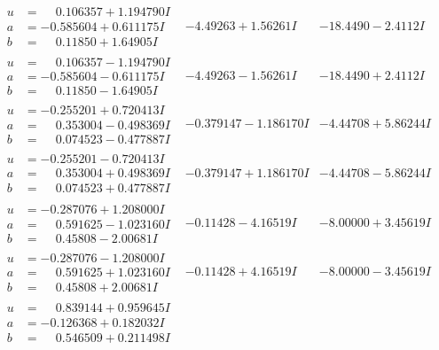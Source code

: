 \documentclass[1p]{elsarticle_modified}
\theoremstyle{definition}
\begin{document}
$$\begin{array}{c|c|c}
\begin{aligned}
u &= \phantom{-}0.106357 + 1.194790 I \\
a &= -0.585604 + 0.611175 I \\
b &= \phantom{-}0.11850 + 1.64905 I\end{aligned}
 & -4.49263 + 1.56261 I & -18.4490 - 2.4112 I \\ \hline\begin{aligned}
u &= \phantom{-}0.106357 - 1.194790 I \\
a &= -0.585604 - 0.611175 I \\
b &= \phantom{-}0.11850 - 1.64905 I\end{aligned}
 & -4.49263 - 1.56261 I & -18.4490 + 2.4112 I \\ \hline\begin{aligned}
u &= -0.255201 + 0.720413 I \\
a &= \phantom{-}0.353004 - 0.498369 I \\
b &= \phantom{-}0.074523 - 0.477887 I\end{aligned}
 & -0.379147 - 1.186170 I & -4.44708 + 5.86244 I \\ \hline\begin{aligned}
u &= -0.255201 - 0.720413 I \\
a &= \phantom{-}0.353004 + 0.498369 I \\
b &= \phantom{-}0.074523 + 0.477887 I\end{aligned}
 & -0.379147 + 1.186170 I & -4.44708 - 5.86244 I \\ \hline\begin{aligned}
u &= -0.287076 + 1.208000 I \\
a &= \phantom{-}0.591625 - 1.023160 I \\
b &= \phantom{-}0.45808 - 2.00681 I\end{aligned}
 & -0.11428 - 4.16519 I & -8.00000 + 3.45619 I \\ \hline\begin{aligned}
u &= -0.287076 - 1.208000 I \\
a &= \phantom{-}0.591625 + 1.023160 I \\
b &= \phantom{-}0.45808 + 2.00681 I\end{aligned}
 & -0.11428 + 4.16519 I & -8.00000 - 3.45619 I \\ \hline\begin{aligned}
u &= \phantom{-}0.839144 + 0.959645 I \\
a &= -0.126368 + 0.182032 I \\
b &= \phantom{-}0.546509 + 0.211498 I\end{aligned}

\end{array}$$
\end{document}
